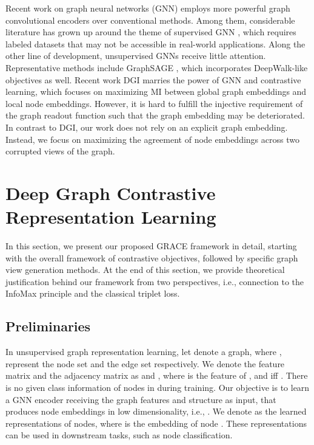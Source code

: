 \documentclass{article}
\theoremstyle{remark}
\begin{document}
Recent work on graph neural networks (GNN) employs more powerful graph convolutional encoders over conventional methods. Among them, considerable literature has grown up around the theme of supervised GNN \cite{Kipf:2016tc,Velickovic:2018we,Hu:2019vq,Wu:2019vz}, which requires labeled datasets that may not be accessible in real-world applications.
Along the other line of development, unsupervised GNNs receive little attention. Representative methods include GraphSAGE \cite{Hamilton:2017tp}, which incorporates DeepWalk-like objectives as well. Recent work DGI \cite{Velickovic:2019tu} marries the power of GNN and contrastive learning, which focuses on maximizing MI between global graph embeddings and local node embeddings. However, it is hard to fulfill the injective requirement of the graph readout function such that the graph embedding may be deteriorated. In contrast to DGI, our work does not rely on an explicit graph embedding. Instead, we focus on maximizing the agreement of node embeddings across two corrupted views of the graph.

 \makeatletter
\def\mathcenterto#1#2{\mathclap{\phantom{#1}\mathclap{#2}}\phantom{#1}}
\let\old@widetilde\widetilde
\def\widetildeto#1#2{\mathcenterto{#2}{\old@widetilde{\mathcenterto{#1}{#2\,}}}}
\let\old@widehat\widehat
\def\widehatto#1#2{\mathcenterto{#2}{\old@widehat{\mathcenterto{#1}{#2\,}}}}
\makeatother
\def\widetilde{\widetildeto{X}}

\section{Deep Graph Contrastive Representation Learning}

In this section, we present our proposed GRACE framework in detail, starting with the overall framework of contrastive objectives, followed by specific graph view generation methods. At the end of this section, we provide theoretical justification behind our framework from two perspectives, i.e., connection to the InfoMax principle and the classical triplet loss.

\subsection{Preliminaries}
In unsupervised graph representation learning, let  denote a graph, where ,  represent the node set and the edge set respectively. We denote the feature matrix and the adjacency matrix as  and , where  is the feature of , and  iff .
There is no given class information of nodes in  during training.
Our objective is to learn a GNN encoder  receiving the graph features and structure as input, that produces node embeddings in low dimensionality, i.e., . We denote  as the learned representations of nodes, where  is the embedding of node . These representations can be used in downstream tasks, such as node classification.
\end{document}
